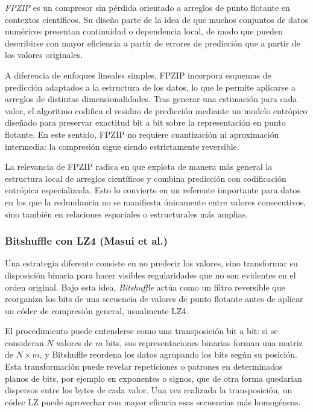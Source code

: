 \textit{FPZIP}\cite{lindstrom2006fpzip} es un compresor sin pérdida orientado a arreglos
de punto flotante en contextos científicos. Su diseño parte de la idea de que muchos
conjuntos de datos numéricos presentan continuidad o dependencia local, de modo que
pueden describirse con mayor eficiencia a partir de errores de predicción que a partir de
los valores originales.

A diferencia de enfoques lineales simples, FPZIP incorpora esquemas de predicción
adaptados a la estructura de los datos, lo que le permite aplicarse a arreglos de
distintas dimensionalidades. Tras generar una estimación para cada valor, el algoritmo
codifica el residuo de predicción mediante un modelo entrópico diseñado para preservar
exactitud bit a bit sobre la representación en punto flotante. En este sentido, FPZIP no
requiere cuantización ni aproximación intermedia: la compresión sigue siendo
estrictamente reversible.

La relevancia de FPZIP radica en que explota de manera más
general la estructura local de arreglos científicos y combina predicción con codificación
entrópica especializada. Esto lo convierte en un referente importante para datos en los
que la redundancia no se manifiesta únicamente entre valores consecutivos, sino también
en relaciones espaciales o estructurales más amplias.

\subsubsection{Bitshuffle con LZ4 (Masui et al.)}

Una estrategia diferente consiste en no predecir los valores, sino transformar su
disposición binaria para hacer visibles regularidades que no son evidentes en el orden
original. Bajo esta idea, \textit{Bitshuffle}\cite{masui2015bitshuffle} actúa como un filtro
reversible que reorganiza los bits de una secuencia de valores de punto flotante antes de
aplicar un códec de compresión general, usualmente LZ4.

El procedimiento puede entenderse como una transposición bit a bit: si se consideran
$N$ valores de $m$ bits, sus representaciones binarias forman una matriz de
$N \times m$, y Bitshuffle reordena los datos agrupando los bits según su posición. Esta
transformación puede revelar repeticiones o patrones en determinados planos de bits,
por ejemplo en exponentes o signos, que de otra forma quedarían dispersos entre los
bytes de cada valor. Una vez realizada la transposición, un códec LZ puede aprovechar
con mayor eficacia esas secuencias más homogéneas.


